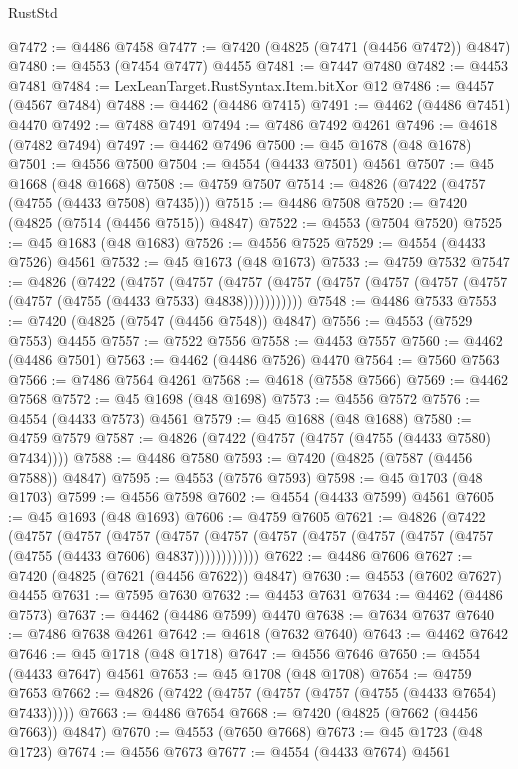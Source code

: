 \begin{lexlean}{RustStd}
\begin{coremodule}
@7472 := @4486 @7458
@7477 := @7420 (@4825 (@7471 (@4456 @7472)) @4847)
@7480 := @4553 (@7454 @7477) @4455
@7481 := @7447 @7480
@7482 := @4453 @7481
@7484 := LexLeanTarget.RustSyntax.Item.bitXor @12
@7486 := @4457 (@4567 @7484)
@7488 := @4462 (@4486 @7415)
@7491 := @4462 (@4486 @7451) @4470
@7492 := @7488 @7491
@7494 := @7486 @7492 @4261
@7496 := @4618 (@7482 @7494)
@7497 := @4462 @7496
@7500 := @45 @1678 (@48 @1678)
@7501 := @4556 @7500
@7504 := @4554 (@4433 @7501) @4561
@7507 := @45 @1668 (@48 @1668)
@7508 := @4759 @7507
@7514 := @4826 (@7422 (@4757 (@4755 (@4433 @7508) @7435)))
@7515 := @4486 @7508
@7520 := @7420 (@4825 (@7514 (@4456 @7515)) @4847)
@7522 := @4553 (@7504 @7520)
@7525 := @45 @1683 (@48 @1683)
@7526 := @4556 @7525
@7529 := @4554 (@4433 @7526) @4561
@7532 := @45 @1673 (@48 @1673)
@7533 := @4759 @7532
@7547 := @4826
    (@7422
      (@4757
        (@4757
          (@4757 (@4757 (@4757 (@4757 (@4757 (@4757 (@4757 (@4755 (@4433 @7533) @4838)))))))))))
@7548 := @4486 @7533
@7553 := @7420 (@4825 (@7547 (@4456 @7548)) @4847)
@7556 := @4553 (@7529 @7553) @4455
@7557 := @7522 @7556
@7558 := @4453 @7557
@7560 := @4462 (@4486 @7501)
@7563 := @4462 (@4486 @7526) @4470
@7564 := @7560 @7563
@7566 := @7486 @7564 @4261
@7568 := @4618 (@7558 @7566)
@7569 := @4462 @7568
@7572 := @45 @1698 (@48 @1698)
@7573 := @4556 @7572
@7576 := @4554 (@4433 @7573) @4561
@7579 := @45 @1688 (@48 @1688)
@7580 := @4759 @7579
@7587 := @4826 (@7422 (@4757 (@4757 (@4755 (@4433 @7580) @7434))))
@7588 := @4486 @7580
@7593 := @7420 (@4825 (@7587 (@4456 @7588)) @4847)
@7595 := @4553 (@7576 @7593)
@7598 := @45 @1703 (@48 @1703)
@7599 := @4556 @7598
@7602 := @4554 (@4433 @7599) @4561
@7605 := @45 @1693 (@48 @1693)
@7606 := @4759 @7605
@7621 := @4826
    (@7422
      (@4757
        (@4757
          (@4757
            (@4757 (@4757 (@4757 (@4757 (@4757 (@4757 (@4757 (@4755 (@4433 @7606) @4837))))))))))))
@7622 := @4486 @7606
@7627 := @7420 (@4825 (@7621 (@4456 @7622)) @4847)
@7630 := @4553 (@7602 @7627) @4455
@7631 := @7595 @7630
@7632 := @4453 @7631
@7634 := @4462 (@4486 @7573)
@7637 := @4462 (@4486 @7599) @4470
@7638 := @7634 @7637
@7640 := @7486 @7638 @4261
@7642 := @4618 (@7632 @7640)
@7643 := @4462 @7642
@7646 := @45 @1718 (@48 @1718)
@7647 := @4556 @7646
@7650 := @4554 (@4433 @7647) @4561
@7653 := @45 @1708 (@48 @1708)
@7654 := @4759 @7653
@7662 := @4826 (@7422 (@4757 (@4757 (@4757 (@4755 (@4433 @7654) @7433)))))
@7663 := @4486 @7654
@7668 := @7420 (@4825 (@7662 (@4456 @7663)) @4847)
@7670 := @4553 (@7650 @7668)
@7673 := @45 @1723 (@48 @1723)
@7674 := @4556 @7673
@7677 := @4554 (@4433 @7674) @4561

\end{coremodule}
\end{lexlean}
